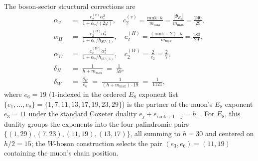 ﻿\documentclass[reprint,amsmath,amssymb,aps,prd,longbibliography,floatfix]{revtex4-2}
\begin{document}
The boson-sector structural corrections are
\begin{align}
\alpha_v &\;=\; \frac{c_2^{(v)} \alpha_\tau^2}{1 + \alpha_\tau / (2\varphi)},
\quad c_2^{(v)} = \frac{\text{rank} \cdot h}{m_{\max}} = \frac{|\Phi_{E_8}|}{m_{\max}} = \frac{240}{29},
   \label{eq:alphav-derived} \\
\alpha_H &\;=\; \frac{c_2^{(H)} \alpha_\tau^2}{1 + \alpha_\tau / h_{SU(3)}},
\quad c_2^{(H)} = \frac{(\text{rank} - 2) \cdot h}{m_{\max}} = \frac{180}{29},
   \label{eq:alphaH-derived} \\
\alpha_W &\;=\; \frac{c_2^{(W)} \alpha_\tau^2}{1 + \alpha_\tau / h_{SU(3)}},
\quad c_2^{(W)} = \frac{2}{e_2} = \frac{2}{7},
   \label{eq:alphaW-derived} \\
\delta_H &\;=\; \frac{1}{h + m_{\max}} \;=\; \frac{1}{59},
   \label{eq:deltaHbox} \\
\delta_W &\;=\; \frac{\delta_H}{e_6} \;=\; \frac{1}{(h + m_{\max}) \cdot 19} \;=\; \frac{1}{1121},
   \label{eq:deltaWbox}
\end{align}
where $e_6 = 19$ (1-indexed in the ordered $E_8$ exponent list
$\{e_1,\ldots,e_8\}=\{1,7,11,13,17,19,23,29\}$) is the partner of the
muon's $E_8$ exponent $e_3 = 11$ under the standard Coxeter duality
$e_j + e_{\text{rank}+1-j} = h$~\cite{Humphreys1990}. For $E_8$, this
duality groups the exponents into the four palindromic pairs
$\{(1,29), (7,23), (11,19), (13,17)\}$, all summing to
$h = 30$ and centered on $h/2 = 15$; the $W$-boson construction
selects the pair $(e_3, e_6) = (11, 19)$ containing the muon's
chain position.
\end{document}
